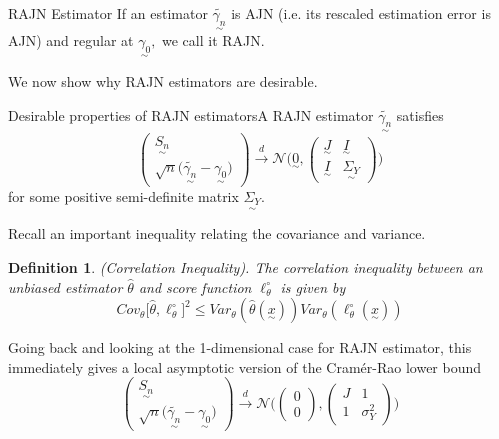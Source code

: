 \documentclass[twoside]{article}
\newtheorem{definition}[theorem]{Definition}
\newcommand{\utilde}{\underset{\sim}}
\begin{document}
\begin{definition_exam}{RAJN Estimator}{} If an estimator $\tilde{\utilde{\gamma_{n}}}$ is AJN (i.e. its rescaled estimation error is AJN) and regular at $\utilde{\gamma_{0}},$ we call it RAJN.
\end{definition_exam}

We now show why RAJN estimators are desirable.

\begin{theorem_exam}{Desirable properties of RAJN estimators}{}A RAJN estimator $\tilde{\utilde{\gamma_{n}}}$ satisfies
\begin{equation}
\begin{pmatrix}
\utilde{S_n}\\
\sqrt{n}\big(\tilde{\utilde{\gamma_{n}}} - \utilde{\gamma_{0}} \big)
\end{pmatrix}
\xrightarrow{d}
\mathcal{N}\bigg(\utilde{0}, \begin{pmatrix}
\utilde{J} & \utilde{I}\\
\utilde{I} & \utilde{\Sigma_{Y}}
\end{pmatrix}
 \bigg)
\end{equation}
for some positive semi-definite matrix $\utilde{\Sigma_{Y}}$.
\end{theorem_exam}

Recall an important inequality relating the covariance and variance.
\begin{definition}(Correlation Inequality). The correlation inequality between an unbiased estimator $\hat{\theta}$ and score function $\ell_{\theta}^{\circ}$ is given by 
$$
Cov_{\theta}\bigg[ \hat{\theta},\ell_{\theta}^{\circ}\bigg]^2 \leq Var_{\theta}(\hat{\theta}(\utilde{x}))Var_{\theta}(\ell_{\theta}^{\circ}(\utilde{x}))
$$
\end{definition}

Going back and looking at the 1-dimensional case for RAJN estimator, this immediately gives a local asymptotic version of the Cramér-Rao lower bound
$$
\begin{pmatrix}
\utilde{S_n}\\
\sqrt{n}\big(\tilde{\utilde{\gamma_{n}}} - \utilde{\gamma_{0}} \big)
\end{pmatrix}
\xrightarrow{d}
\mathcal{N}\bigg(
\begin{pmatrix}
0\\
0
\end{pmatrix}
, \begin{pmatrix}
J & 1\\
1 & \sigma_{Y}^{2}
\end{pmatrix}
 \bigg)
$$
\end{document}

